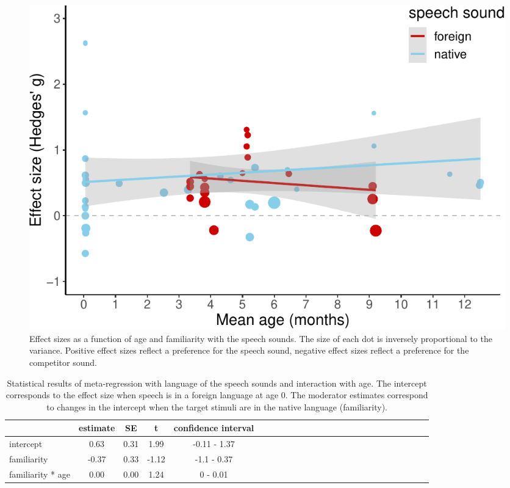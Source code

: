 \documentclass[man]{apa6}
\begin{document}
\begin{figure}
\centering
\includegraphics{MA_speech_pref_files/figure-latex/lang-1.pdf}
\caption{\label{fig:lang}Effect sizes as a function of age and familiarity
with the speech sounds. The size of each dot is inversely proportional
to the variance. Positive effect sizes reflect a preference for the
speech sound, negative effect sizes reflect a preference for the
competitor sound.}
\end{figure}

\begin{table}[tbp]
\begin{center}
\begin{threeparttable}
\caption{\label{tab:TableLang}Statistical results of meta-regression with language of the speech sounds and interaction with age. The intercept corresponds to the effect size when speech is in a foreign language at age 0. The moderator estimates correspond to changes in the intercept when the target stimuli are in the native language (familiarity).}
\begin{tabular}{lcccclcccclcccclcccclcccc}
\toprule
 & estimate & SE & t & confidence interval\\
\midrule
intercept & 0.63 & 0.31 & 1.99 & -0.11 - 1.37\\
familiarity & -0.37 & 0.33 & -1.12 & -1.1 - 0.37\\
familiarity * age & 0.00 & 0.00 & 1.24 & 0 - 0.01\\
\bottomrule
\end{tabular}
\end{threeparttable}
\end{center}
\end{table}
\end{document}
